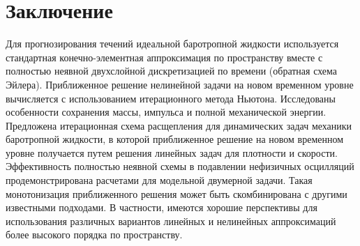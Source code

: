 \documentclass[10pt,twocolumn]{article}
\begin{document}
\section{Заключение}

Для прогнозирования течений идеальной баротропной жидкости используется стандартная конечно-элементная аппроксимация по пространству вместе с полностью неявной двухслойной дискретизацией по времени (обратная схема Эйлера). Приближенное решение нелинейной задачи на новом временном уровне вычисляется с использованием итерационного метода Ньютона. Исследованы особенности сохранения массы, импульса и полной механической энергии. Предложена итерационная схема расщепления для динамических задач механики баротропной жидкости, в которой приближенное решение на новом временном уровне получается путем решения линейных задач для плотности и скорости. Эффективность полностью неявной схемы в подавлении нефизичных осцилляций продемонстрирована расчетами для модельной двумерной задачи. Такая монотонизация приближенного решения может быть скомбинирована с другими известными подходами. В частности, имеются хорошие перспективы для использования различных вариантов линейных и нелинейных аппроксимаций более высокого порядка по пространству.
\end{document}
